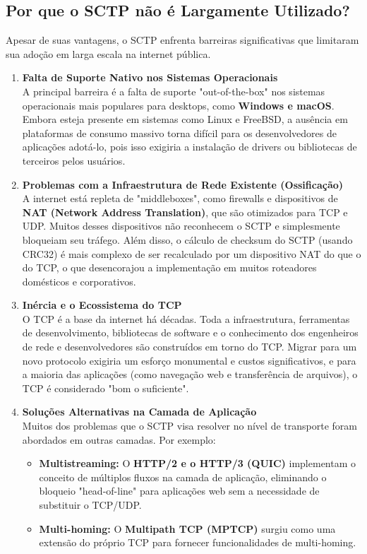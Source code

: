\begin{enumerate}[label=\alph*.]
\subsection*{Por que o SCTP não é Largamente Utilizado?}

Apesar de suas vantagens, o SCTP enfrenta barreiras significativas que limitaram sua adoção em larga escala na internet pública.

\begin{enumerate}
    \item \textbf{Falta de Suporte Nativo nos Sistemas Operacionais}\\
    A principal barreira é a falta de suporte "out-of-the-box" nos sistemas operacionais mais populares para desktops, como \textbf{Windows e macOS}. Embora esteja presente em sistemas como Linux e FreeBSD, a ausência em plataformas de consumo massivo torna difícil para os desenvolvedores de aplicações adotá-lo, pois isso exigiria a instalação de drivers ou bibliotecas de terceiros pelos usuários.

    \item \textbf{Problemas com a Infraestrutura de Rede Existente (Ossificação)}\\
    A internet está repleta de "middleboxes", como firewalls e dispositivos de \textbf{NAT (Network Address Translation)}, que são otimizados para TCP e UDP. Muitos desses dispositivos não reconhecem o SCTP e simplesmente bloqueiam seu tráfego. Além disso, o cálculo de checksum do SCTP (usando CRC32) é mais complexo de ser recalculado por um dispositivo NAT do que o do TCP, o que desencorajou a implementação em muitos roteadores domésticos e corporativos.

    \item \textbf{Inércia e o Ecossistema do TCP}\\
    O TCP é a base da internet há décadas. Toda a infraestrutura, ferramentas de desenvolvimento, bibliotecas de software e o conhecimento dos engenheiros de rede e desenvolvedores são construídos em torno do TCP. Migrar para um novo protocolo exigiria um esforço monumental e custos significativos, e para a maioria das aplicações (como navegação web e transferência de arquivos), o TCP é considerado "bom o suficiente".

    \item \textbf{Soluções Alternativas na Camada de Aplicação}\\
    Muitos dos problemas que o SCTP visa resolver no nível de transporte foram abordados em outras camadas. Por exemplo:
    \begin{itemize}
        \item \textbf{Multistreaming:} O \textbf{HTTP/2 e o HTTP/3 (QUIC)} implementam o conceito de múltiplos fluxos na camada de aplicação, eliminando o bloqueio "head-of-line" para aplicações web sem a necessidade de substituir o TCP/UDP.
        \item \textbf{Multi-homing:} O \textbf{Multipath TCP (MPTCP)} surgiu como uma extensão do próprio TCP para fornecer funcionalidades de multi-homing.
    \end{itemize}


\end{enumerate}
\end{enumerate}
